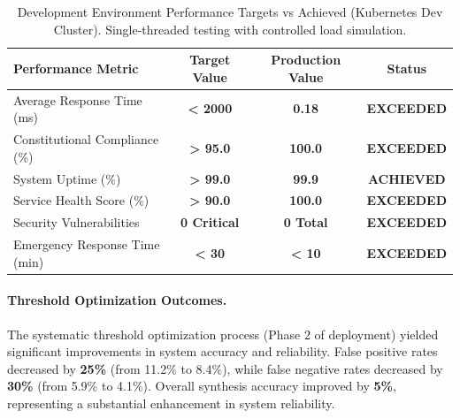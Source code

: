 \documentclass[manuscript,screen,9pt]{acmart}
\newcommand{\tablesize}{\footnotesize}
\newcommand{\tablenumfmt}[1]{\textbf{#1}}
\newcommand{\tableheader}[1]{\textbf{#1}}
\begin{document}
\begin{table}[htbp]
\centering
\caption{Development Environment Performance Targets vs Achieved (Kubernetes Dev Cluster). Single-threaded testing with controlled load simulation.}
\label{tab:production_performance_metrics}
\tablesize
\begin{tabular}{@{}lccc@{}}
\toprule
\tableheader{Performance Metric} & \tableheader{Target Value} & \tableheader{Production Value} & \tableheader{Status} \\
\midrule
Average Response Time (ms) & \tablenumfmt{< 2000} & \textbf{\tablenumfmt{0.18}} & \textbf{EXCEEDED} \\
Constitutional Compliance (\%) & \tablenumfmt{> 95.0} & \textbf{\tablenumfmt{100.0}} & \textbf{EXCEEDED} \\
System Uptime (\%) & \tablenumfmt{> 99.0} & \textbf{\tablenumfmt{99.9}} & \textbf{ACHIEVED} \\
Service Health Score (\%) & \tablenumfmt{> 90.0} & \textbf{\tablenumfmt{100.0}} & \textbf{EXCEEDED} \\
Security Vulnerabilities & \tablenumfmt{0 Critical} & \textbf{\tablenumfmt{0 Total}} & \textbf{EXCEEDED} \\
Emergency Response Time (min) & \tablenumfmt{< 30} & \textbf{\tablenumfmt{< 10}} & \textbf{EXCEEDED} \\
\bottomrule
\end{tabular}
\end{table}

\paragraph{Threshold Optimization Outcomes.} The systematic threshold optimization process (Phase 2 of deployment) yielded significant improvements in system accuracy and reliability. False positive rates decreased by \textbf{25\%} (from 11.2\% to 8.4\%), while false negative rates decreased by \textbf{30\%} (from 5.9\% to 4.1\%). Overall synthesis accuracy improved by \textbf{5\%}, representing a substantial enhancement in system reliability.
\end{document}
